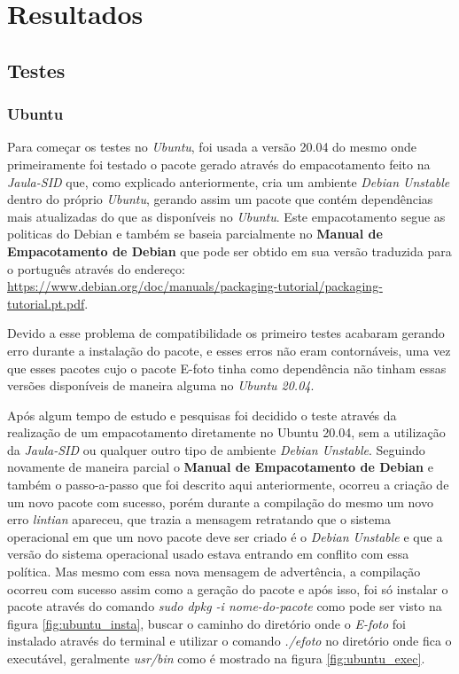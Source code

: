 \chapter{Resultados}

\section{Testes}

\subsection{Ubuntu}
Para começar os testes no \textit{Ubuntu}, foi usada a versão 20.04 do mesmo onde primeiramente foi testado o pacote gerado através do empacotamento feito na \textit{Jaula-SID} que, como explicado anteriormente, cria um ambiente \textit{Debian Unstable} dentro do próprio \textit{Ubuntu}, gerando assim um pacote que contém dependências mais atualizadas do que as disponíveis no \textit{Ubuntu}. Este empacotamento segue as politicas do Debian e também se baseia parcialmente no \textbf{Manual de Empacotamento de Debian} que pode ser obtido em sua versão traduzida para o português através do endereço: \url{https://www.debian.org/doc/manuals/packaging-tutorial/packaging-tutorial.pt.pdf}.
 
Devido a esse problema de compatibilidade os primeiro testes acabaram gerando erro durante a instalação do pacote, e esses erros não eram contornáveis, uma vez que esses pacotes cujo o pacote E-foto tinha como dependência não tinham essas versões disponíveis de maneira alguma no \textit{Ubuntu 20.04}. 

Após algum tempo de estudo e pesquisas foi decidido o teste através da realização de um empacotamento diretamente no Ubuntu 20.04, sem a utilização da \textit{Jaula-SID} ou qualquer outro tipo de ambiente \textit{Debian Unstable}. Seguindo novamente de maneira parcial o \textbf{Manual de Empacotamento de Debian} e também o passo-a-passo que foi descrito aqui anteriormente, ocorreu a criação de um novo pacote com sucesso, porém durante a compilação do mesmo um novo erro \textit{lintian} apareceu, que trazia a mensagem retratando que o sistema operacional em que um novo pacote deve ser criado é o \textit{Debian Unstable} e que a versão do sistema operacional usado estava entrando em conflito com essa política. Mas mesmo com essa nova mensagem de advertência, a compilação ocorreu com sucesso assim como a geração do pacote e após isso, foi só instalar o pacote através do comando \textit{sudo dpkg -i nome-do-pacote} como pode ser visto na figura \ref{fig:ubuntu_insta}, buscar o caminho do diretório onde o \textit{E-foto} foi instalado através do terminal e utilizar o comando \textit{./efoto} no diretório onde fica o executável, geralmente \textit{usr/bin} como é mostrado na figura \ref{fig:ubuntu_exec}.

